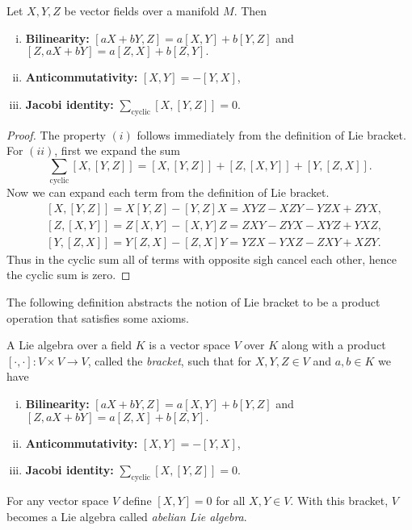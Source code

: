 \begin{proposition}
	Let $ X,Y,Z $ be vector fields over a manifold $ M $. Then 
	\begin{enumerate}[(i)]
		\item \textbf{Bilinearity:} $ [aX+bY,Z] = a[X,Y] + b[Y,Z] $ and $ [Z,aX+bY] = a[Z,X] + b[Z,Y]. $
		\item \textbf{Anticommutativity:} $ [X,Y] = - [Y,X] $,
		\item \textbf{Jacobi identity:} $ \sum_\text{cyclic} [X,[Y,Z]] = 0 $.
	\end{enumerate}
\end{proposition}
\begin{proof}
	The property $ (i) $ follows immediately from the definition of Lie bracket. For $ (ii) $, first we expand the sum
	\[ \sum_\text{cyclic}[X,[Y,Z]] = [X,[Y,Z]] + [Z,[X,Y]] + [Y,[Z,X]]. \]
	Now we can expand each term from the definition of Lie bracket.
	\begin{align*}
		& [X,[Y,Z]] = X[Y,Z] - [Y,Z]X = XYZ - XZY - YZX + ZYX,\\
		& [Z,[X,Y]] = Z[X,Y] - [X,Y]Z = ZXY - ZYX - XYZ + YXZ,\\
		& [Y,[Z,X]] = Y[Z,X] - [Z,X]Y = YZX - YXZ - ZXY + XZY.
	\end{align*}
	Thus in the cyclic sum all of terms with opposite sigh cancel each other, hence the cyclic sum is zero.
\end{proof}

The following definition abstracts the notion of Lie bracket to be a product operation that satisfies some axioms.

\begin{definition}
	\label{def:LieAlgebra}
	A Lie algebra over a field $ K $ is a vector space $ V $ over $ K $ along with a product $ [\cdot,\cdot]: V\times V \to V $, called the \emph{bracket}, such that for $ X,Y,Z \in V $ and $ a,b \in K $ we have 
	\begin{enumerate}[(i)]
		\item \textbf{Bilinearity:} $ [aX+bY,Z] = a[X,Y] + b[Y,Z] $ and $ [Z,aX+bY] = a[Z,X] + b[Z,Y]. $
		\item \textbf{Anticommutativity:} $ [X,Y] = - [Y,X] $,
		\item \textbf{Jacobi identity:} $ \sum_\text{cyclic} [X,[Y,Z]] = 0 $.
	\end{enumerate}
\end{definition}
\begin{example}
	For any vector space $ V $ define $ [X,Y] = 0 $ for all $ X,Y \in V $. With this bracket, $ V $ becomes a Lie algebra called \emph{abelian Lie algebra}.
\end{example}

